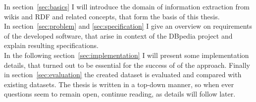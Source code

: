 In section~\ref{sec:basics} I will introduce the domain of information extraction from wikis and RDF and related concepts, that form the basis of this thesis.\\
In section~\ref{sec:problem} and \ref{sec:specification} I give an overview on  requirements of the developed software, that arise in context of the DBpedia project and explain resulting specifications.\\
In the following section~\ref{sec:implementation} I will present some implementation details, that turned out to be essential for the success of of the approach. Finally in section~\ref{sec:evaluation} the created dataset is evaluated and compared with existing datasets. The thesis is written in a top-down manner, so when ever questions seem to remain open, continue reading, as details will follow later.

\newpage
